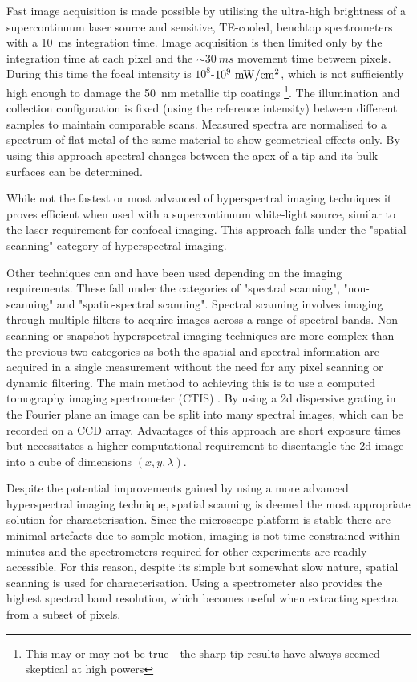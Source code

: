 \documentclass{book}
\begin{document}
Fast image acquisition is made possible by utilising the ultra-high brightness of a supercontinuum laser source and sensitive, TE-cooled, benchtop spectrometers with a \SI{10}{ms} integration time. Image acquisition is then limited only by the integration time at each pixel and the $\sim\SI{30}{ms}$ movement time between pixels. During this time the focal intensity is $10^8$-$10^9~\si{mW \per cm\squared}$, which is not sufficiently high enough to damage the \SI{50}{nm} metallic tip coatings \footnote{This may or may not be true - the sharp tip results have always seemed skeptical at high powers}. The illumination and collection configuration is fixed (using the reference intensity) between different samples to maintain comparable scans. Measured spectra are normalised to a spectrum of flat metal of the same material to show geometrical effects only. By using this approach spectral changes between the apex of a tip and its bulk surfaces can be determined.

While not the fastest or most advanced of hyperspectral imaging techniques it proves efficient when used with a supercontinuum white-light source, similar to the laser requirement for confocal imaging. This approach falls under the "spatial scanning" category of hyperspectral imaging.


Other techniques can and have been used depending on the imaging requirements. These fall under the categories of "spectral scanning", "non-scanning" and "spatio-spectral scanning".
Spectral scanning involves imaging through multiple filters to acquire images across a range of spectral bands.
Non-scanning or snapshot hyperspectral imaging techniques are more complex than the previous two categories as both the spatial and spectral information are acquired in a single measurement without the need for any pixel scanning or dynamic filtering. The main method to achieving this is to use a computed tomography imaging spectrometer (CTIS) \cite{okamoto1991simultaneous, bulygin1992spectrotomography, okamoto1993simultaneous, descour1995computed}. By using a 2d dispersive grating in the Fourier plane an image can be split into many spectral images, which can be recorded on a CCD array. Advantages of this approach are short exposure times but necessitates a higher computational requirement to disentangle the 2d image into a cube of dimensions $(x,y,\lambda)$.

Despite the potential improvements gained by using a more advanced hyperspectral imaging technique, spatial scanning is deemed the most appropriate solution for characterisation. Since the microscope platform is stable there are minimal artefacts due to sample motion, imaging is not time-constrained within minutes and the spectrometers required for other experiments are readily accessible. For this reason, despite its simple but somewhat slow nature, spatial scanning is used for characterisation. Using a spectrometer also provides the highest spectral band resolution, which becomes useful when extracting spectra from a subset of pixels.
\end{document}
